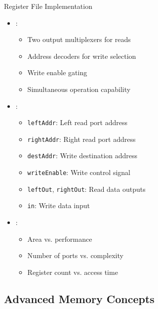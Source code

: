 \begin{frame}{Register File Implementation}
\begin{itemize}
\item {}:
\begin{itemize}
\item Two output multiplexers for reads
\item Address decoders for write selection
\item Write enable gating
\item Simultaneous operation capability
\end{itemize}
\vspace{0.5cm}
\item {}:
\begin{itemize}
\item \texttt{leftAddr}: Left read port address
\item \texttt{rightAddr}: Right read port address
\item \texttt{destAddr}: Write destination address
\item \texttt{writeEnable}: Write control signal
\item \texttt{leftOut}, \texttt{rightOut}: Read data outputs
\item \texttt{in}: Write data input
\end{itemize}
\vspace{0.3cm}
\item {}:
\begin{itemize}
\item Area vs. performance
\item Number of ports vs. complexity
\item Register count vs. access time
\end{itemize}
\end{itemize}
\end{frame}

\subsection{Advanced Memory Concepts}

